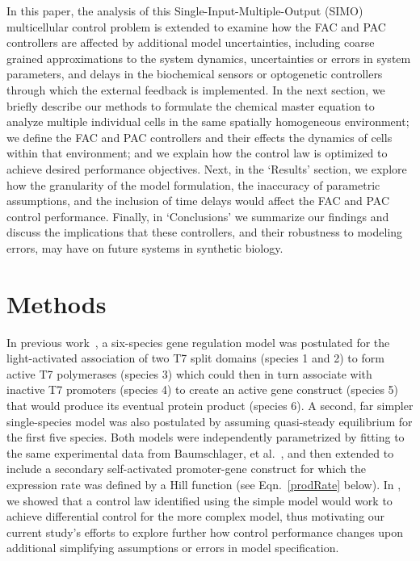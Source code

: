 \documentclass[12pt]{article}
\begin{document}
In this paper, the analysis of this Single-Input-Multiple-Output (SIMO) multicellular control problem is extended to examine how the FAC and PAC controllers are affected by additional model uncertainties, including coarse grained approximations to the system dynamics, uncertainties or errors in system parameters, and delays in the biochemical sensors or optogenetic controllers through which the external feedback is implemented. In the next section, we briefly describe our methods to formulate the chemical master equation to analyze multiple individual cells in the same spatially homogeneous environment; we define the FAC and PAC controllers and their effects the dynamics of cells within that environment; and we explain how the control law is optimized to achieve desired performance objectives. Next, in the `Results' section, we explore how the granularity of the model formulation, the inaccuracy of parametric assumptions, and the inclusion of time delays would affect the FAC and PAC control performance. Finally, in `Conclusions' we summarize our findings and discuss the implications that these controllers, and their robustness to modeling errors, may have on future systems in synthetic biology.

\section{Methods}
In previous work~\cite{May2021}, a six-species gene regulation model was postulated for the light-activated association of two T7 split domains (species 1 and 2) to form active T7 polymerases (species 3) which could then in turn associate with inactive T7 promoters (species 4) to create an active gene construct (species 5) that would produce its eventual protein product (species 6). A second, far simpler single-species model was also postulated by assuming quasi-steady equilibrium for the first five species. Both models were independently parametrized by fitting to the same experimental data from Baumschlager, et al.~\cite{XXX}, and then extended to include a secondary self-activated promoter-gene construct for which the expression rate was defined by a Hill function (see Eqn.\ \ref{prodRate} below). In \cite{May2021}, we showed that a control law identified using the simple model would work to achieve differential control for the more complex model, thus motivating our current study's efforts to explore further how control performance changes upon additional simplifying assumptions or errors in model specification. 
\end{document}

